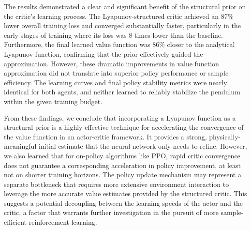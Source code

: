 \documentclass[]{article}
\begin{document}
The results demonstrated a clear and significant benefit of the structural prior on the critic's learning process. The Lyapunov-structured critic achieved an 87\% lower overall training loss and converged substantially faster, particularly in the early stages of training where its loss was 8 times lower than the baseline. Furthermore, the final learned value function was 86\% closer to the analytical Lyapunov function, confirming that the prior effectively guided the approximation. However, these dramatic improvements in value function approximation did not translate into superior policy performance or sample efficiency. The learning curves and final policy stability metrics were nearly identical for both agents, and neither learned to reliably stabilize the pendulum within the given training budget.

From these findings, we conclude that incorporating a Lyapunov function as a structural prior is a highly effective technique for accelerating the convergence of the value function in an actor-critic framework. It provides a strong, physically-meaningful initial estimate that the neural network only needs to refine. However, we also learned that for on-policy algorithms like PPO, rapid critic convergence does not guarantee a corresponding acceleration in policy improvement, at least not on shorter training horizons. The policy update mechanism may represent a separate bottleneck that requires more extensive environment interaction to leverage the more accurate value estimates provided by the structured critic. This suggests a potential decoupling between the learning speeds of the actor and the critic, a factor that warrants further investigation in the pursuit of more sample-efficient reinforcement learning.


{}

\end{document}
